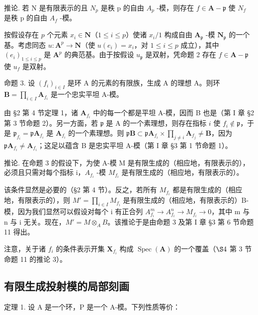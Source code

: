 推论. 若 N 是有限表示的且 \(N_{p}\) 是秩 p 的自由 \(A_{p}\) -模，则存在 \(f \in \mathbf{A} - \mathfrak{p}\) 使 \(N_{f}\) 是秩 p 的自由 \(A_{f}\) -模。

按假设存在 \(p\) 个元素 \(x_{i} \in \mathbf{N}\)（\(1 \leqslant i \leqslant p\)）使诸 \(x_{i}/1\) 构成自由 \(\mathbf{A}_{\mathfrak{p}}\) -模 \(\mathbf{N}_{\mathfrak{p}}\) 的一个基。考虑同态 \(u: \mathbf{A}^p \to \mathbf{N}\)（使 \(u(e_{i}) = x_{i}\)，对 \(1 \leqslant i \leqslant p\) 成立），其中 \((e_{i})_{1 \leqslant i \leqslant p}\) 是 \(\mathbf{A}^p\) 的典范基。由于按假设 \(u_{\mathfrak{p}}\) 是双射，凭命题 2 存在 \(f \in \mathbf{A} - \mathfrak{p}\) 使 \(u_{f}\) 是双射。

命题 3. 设 \((f_{i})_{i\in I}\) 是环 A 的元素的有限族，生成 A 的理想 A。则环 \(\mathbf{B} = \prod_{i\in I}\mathbf{A}_{f_i}\) 是一个忠实平坦 A-模。

由 §2 第 4 节定理 1，诸 \(\mathbf{A}_{f_i}\) 中的每一个都是平坦 A-模，因而 B 也是（第 I 章 §2 第 3 节命题 2）。另一方面，若 \(\mathfrak{p}\) 是 A 的一个素理想，则存在指标 \(i\) 使 \(f_i \notin \mathfrak{p}\)，于是 \(\mathfrak{p}_{f_i} = \mathfrak{p} \mathbf{A}_{f_i}\) 是 \(\mathbf{A}_{f_i}\) 的一个素理想。则 \(\mathfrak{p} \mathbf{B} \subset \mathfrak{p} \mathbf{A}_{f_i} \times \prod_{j \neq i} \mathbf{A}_{f_j} \neq \mathbf{B}\)，因为 \(\mathfrak{p} \mathbf{A}_{f_i} \neq \mathbf{A}_{f_i}\)；这足以蕴含 B 是忠实平坦 A-模（第 I 章 §3 第 1 节命题 1）。

推论. 在命题 3 的假设下，为使 A-模 M 是有限生成的（相应地，有限表示的），必须且只需对每个指标 i，\(A_{f_{i}}\) -模 \(M_{f_{i}}\) 是有限生成的（相应地，有限表示的）。

该条件显然是必要的（§2 第 4 节）。反之，若所有 \(M_{f_{i}}\) 都是有限生成的（相应地，有限表示的），则 \(M' = \prod_{i \in I} M_{f_{i}}\) 是有限生成的（相应地，有限表示的）B-模，因为我们显然可以假设对每个 i 有正合列 \(A_{f_i}^{m} \to A_{f_i}^{n} \to M_{f_i} \to 0\)，其中 m 与 n 与 i 无关。现在，\(M' = M \otimes_{A} B\)。该推论于是由命题 3 及第 I 章 §3 第 6 节命题 11 得出。

注意，关于诸 \(f_{i}\) 的条件表示开集 \(\mathbf{X}_{f_{i}}\) 构成 \(\operatorname{Spec}(\mathbf{A})\) 的一个覆盖（\(\S 4\) 第 3 节命题 11 的推论 3）。

\subsection{有限生成投射模的局部刻画}

定理 1. 设 A 是一个环，P 是一个 A-模。下列性质等价：

